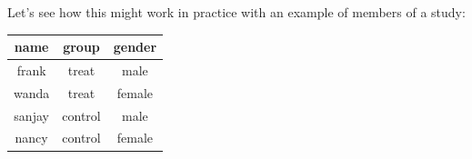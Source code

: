 \documentclass[]{book}
\theoremstyle{definition}
\theoremstyle{definition}
\theoremstyle{definition}
\theoremstyle{remark}
\begin{document}
Let's see how this might work in practice with an example of members of
a study:

\begin{longtable}[]{@{}ccc@{}}
\toprule
\begin{minipage}[b]{0.11\columnwidth}\centering
name\strut
\end{minipage} & \begin{minipage}[b]{0.13\columnwidth}\centering
group\strut
\end{minipage} & \begin{minipage}[b]{0.13\columnwidth}\centering
gender\strut
\end{minipage}\tabularnewline
\midrule
\endhead
\begin{minipage}[t]{0.11\columnwidth}\centering
frank\strut
\end{minipage} & \begin{minipage}[t]{0.13\columnwidth}\centering
treat\strut
\end{minipage} & \begin{minipage}[t]{0.13\columnwidth}\centering
male\strut
\end{minipage}\tabularnewline
\begin{minipage}[t]{0.11\columnwidth}\centering
wanda\strut
\end{minipage} & \begin{minipage}[t]{0.13\columnwidth}\centering
treat\strut
\end{minipage} & \begin{minipage}[t]{0.13\columnwidth}\centering
female\strut
\end{minipage}\tabularnewline
\begin{minipage}[t]{0.11\columnwidth}\centering
sanjay\strut
\end{minipage} & \begin{minipage}[t]{0.13\columnwidth}\centering
control\strut
\end{minipage} & \begin{minipage}[t]{0.13\columnwidth}\centering
male\strut
\end{minipage}\tabularnewline
\begin{minipage}[t]{0.11\columnwidth}\centering
nancy\strut
\end{minipage} & \begin{minipage}[t]{0.13\columnwidth}\centering
control\strut
\end{minipage} & \begin{minipage}[t]{0.13\columnwidth}\centering
female\strut
\end{minipage}\tabularnewline
\bottomrule
\end{longtable}
\end{document}
